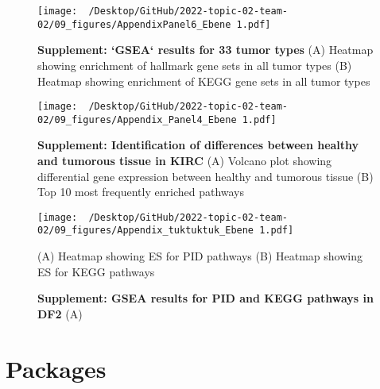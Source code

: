 \documentclass[
  parskip,
  oneside]{scrreprt}
\begin{document}
\begin{figure}[h]
  \texttt{[image: ~/Desktop/GitHub/2022-topic-02-team-02/09\_figures/AppendixPanel6\_Ebene 1.pdf]}
  \caption{\textbf{Supplement: `GSEA` results for 33 tumor types} (A) Heatmap showing enrichment of hallmark gene sets in all tumor types (B) Heatmap showing enrichment of KEGG gene sets in all tumor types}
  \label{hmap}
\end{figure}

\begin{figure}[h]
 \begin{center}
   \texttt{[image: ~/Desktop/GitHub/2022-topic-02-team-02/09\_figures/Appendix\_Panel4\_Ebene 1.pdf]}
  \end{center}
  \caption{\textbf{Supplement: Identification of differences between healthy and tumorous tissue in KIRC } (A) Volcano plot showing differential gene expression between healthy and tumorous tissue (B) Top 10 most frequently enriched pathways}
  \label{volcanoap}
\end{figure}

\begin{figure}[h]
 \begin{center}
   \texttt{[image: ~/Desktop/GitHub/2022-topic-02-team-02/09\_figures/Appendix\_tuktuktuk\_Ebene 1.pdf]}
  \end{center}
  \caption{\textbf{Supplement: GSEA results for PID and KEGG pathways in DF2 } (A) } (A) Heatmap showing ES for PID pathways (B) Heatmap showing ES for KEGG pathways
  \label{tuk}
\end{figure}

\hypertarget{packages-1}{%
\section{Packages}\label{packages-1}}
\end{document}

